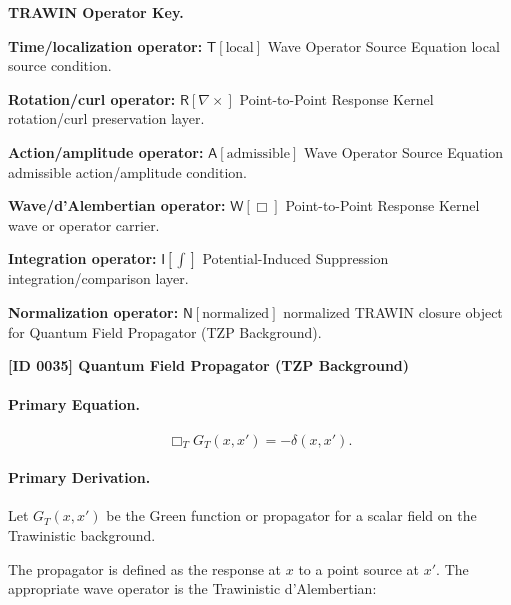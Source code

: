 \par\vspace{0.45\baselineskip}
\noindent\begin{minipage}[t]{\linewidth}
\begingroup
\small
\raggedright
\textbf{TRAWIN Operator Key.}\par
\noindent\textbf{Time/localization operator:} $\mathsf{T}\!\left[\mathrm{local}\right]$ Wave Operator Source Equation local source condition.\par
\noindent\textbf{Rotation/curl operator:} $\mathsf{R}\!\left[\nabla\times\right]$ Point-to-Point Response Kernel rotation/curl preservation layer.\par
\noindent\textbf{Action/amplitude operator:} $\mathsf{A}\!\left[\mathrm{admissible}\right]$ Wave Operator Source Equation admissible action/amplitude condition.\par
\noindent\textbf{Wave/d'Alembertian operator:} $\mathsf{W}\!\left[\Box\right]$ Point-to-Point Response Kernel wave or operator carrier.\par
\noindent\textbf{Integration operator:} $\mathsf{I}\!\left[\int\right]$ Potential-Induced Suppression integration/comparison layer.\par
\noindent\textbf{Normalization operator:} $\mathsf{N}\!\left[\mathrm{normalized}\right]$ normalized TRAWIN closure object for Quantum Field Propagator (TZP Background).\par
\endgroup
\end{minipage}

\clearpage
\noindent\textbf{[ID 0035] Quantum Field Propagator (TZP Background)}\par
\vspace{0.35em}
\paragraph{Primary Equation.}
\begin{equation}
\Box_T G_T(x,x')
=
-\delta(x,x') .
\end{equation}

\paragraph{Primary Derivation.}
Let $G_T(x,x')$ be the Green function or propagator for a scalar field on the Trawinistic background.

The propagator is defined as the response at $x$ to a point source at $x'$.  
The appropriate wave operator is the Trawinistic d'Alembertian:

